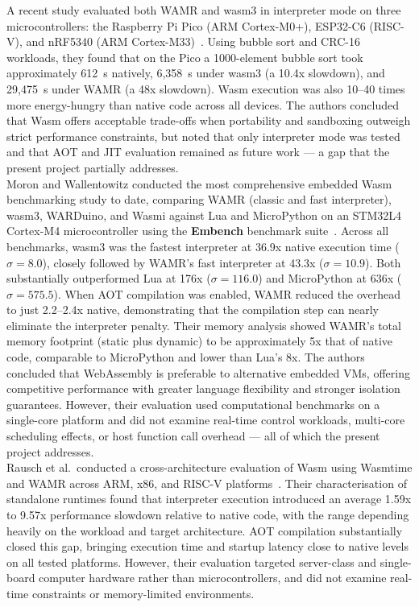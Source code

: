 \documentclass[12pt, a4paper]{report}
\begin{document}
A recent study evaluated both WAMR and wasm3 in interpreter mode on three microcontrollers:
the Raspberry Pi Pico (ARM Cortex-M0+), ESP32-C6 (RISC-V), and nRF5340
(ARM Cortex-M33)~\cite{wasm-iot-constrained}. Using bubble sort and CRC-16 workloads, they
found that on the Pico a 1000-element bubble sort took approximately 612~\textmu{}s
natively, 6,358~\textmu{}s under wasm3 (a 10.4x slowdown), and 29,475~\textmu{}s under
WAMR (a 48x slowdown). Wasm execution was also 10--40 times more energy-hungry than native
code across all devices. The authors concluded that Wasm offers acceptable trade-offs when
portability and sandboxing outweigh strict performance constraints, but noted that only
interpreter mode was tested and that AOT and JIT evaluation remained as future
work --- a gap that the present project partially addresses. \\

Moron and Wallentowitz conducted the most
comprehensive embedded Wasm benchmarking study to date, comparing WAMR (classic and fast
interpreter), wasm3, WARDuino, and Wasmi against Lua and MicroPython on an STM32L4
Cortex-M4 microcontroller using the \textbf{Embench} benchmark suite~\cite{moron2025benchmarking}.
Across all benchmarks, wasm3 was the fastest interpreter at 36.9x native execution time
($\sigma = 8.0$), closely followed by WAMR's fast interpreter at 43.3x ($\sigma = 10.9$).
Both substantially outperformed Lua at 176x ($\sigma = 116.0$) and MicroPython at 636x
($\sigma = 575.5$). When AOT compilation was enabled, WAMR reduced the overhead to just
2.2--2.4x native, demonstrating that the compilation step can nearly eliminate the
interpreter penalty. Their memory analysis showed WAMR's total memory footprint (static plus
dynamic) to be approximately 5x that of native code, comparable to MicroPython and lower
than Lua's 8x. The authors concluded that WebAssembly is preferable to alternative embedded
VMs, offering competitive performance with greater language flexibility and stronger
isolation guarantees. However, their evaluation used computational benchmarks on a
single-core platform and did not examine real-time control workloads, multi-core scheduling
effects, or host function call overhead --- all of which the present project addresses. \\

Rausch et al.\ conducted a
cross-architecture evaluation of Wasm using Wasmtime and WAMR across ARM, x86, and RISC-V
platforms~\cite{rausch2024cross}. Their characterisation of standalone runtimes found that
interpreter execution introduced an average 1.59x to 9.57x performance slowdown relative to
native code, with the range depending heavily on the workload and target architecture. AOT
compilation substantially closed this gap, bringing execution time and startup latency close
to native levels on all tested platforms. However, their evaluation targeted server-class
and single-board computer hardware rather than microcontrollers, and did not examine
real-time constraints or memory-limited environments. \\
\end{document}
